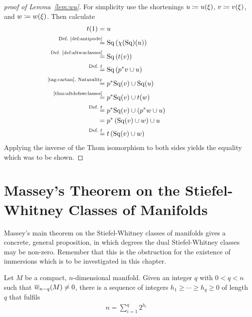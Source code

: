 \begin{proof}[proof of Lemma~\autoref{lem:wu}]
  For simplicity use the shortenings
  $u\coloneqq {u}(\xi)$,
  $v\coloneqq {v}(\xi)$, and
  $w\coloneqq {w}(\xi)$.
  Then calculate
  \begin{align*}
    \thomiso(1)
    &= \U
    \\
    &\equalsby{Def.~\autoref{def:antipode}}
      \SQ\left(\antipode(\SQ)(\U)\right)
    \\
    &\equalsby{Def.~\autoref{def:altwuclasses}}
      \SQ\left(\thomiso(\Vu)\right)
    \\
    &\equalsby{Def.~$\thomiso$}
      \SQ\left(\pb p\Vu \cup \U\right)
    \\
    &\equalsby{\ref{tag:cartan}, Naturality}
      \pb p\SQ(\Vu) \cup \SQ(\U)
    \\
    &\equalsby{\autoref{thm:altdefswclasses}}
      \pb p\SQ(\Vu) \cup \thomiso(\Ws)
    \\
    &\equalsby{Def.~$\thomiso$}
      \pb p\SQ(\Vu) \cup \left(\pb p \Ws \cup \U\right)
    \\
    &=
      \pb p\left(\SQ(\Vu) \cup \Ws\right) \cup \U
    \\
    &\equalsby{Def.~$\thomiso$}
      \thomiso\left(\SQ(\Vu) \cup \Ws\right)
  \end{align*}
  Applying the inverse of the Thom isomorphism to both sides
  yields the equality which was to be shown.
\end{proof}


\section{Massey's Theorem on the Stiefel-Whitney Classes of Manifolds}
\label{sec:massey}
Massey's main theorem on the Stiefel-Whitney classes of manifolds
gives a concrete, general proposition, in which degrees the dual
Stiefel-Whitney classes may be non-zero. Remember that this is the
obstruction for the existence of immersions which is to be
investigated in this chapter.
\begin{Thm}[Massey]\label{thm:massey}
  Let $M$ be a compact, $n$-dimensional manifold.
  Given an integer $q$ with $0<q<n$ such that ${\overline{w}_{n-q}}(M)\neq0$,
  there is a sequence of integers $h_1\geq\dotsb\geq h_q\geq0$ of
  length $q$ that fulfils
  \begin{gather*}
    n = \sum_{i=1}^{q} 2^{h_i}
  \end{gather*}
\end{Thm}

